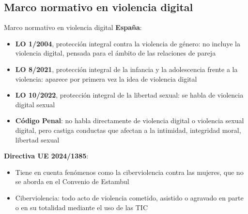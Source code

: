 \documentclass{beamer}
\begin{document}
    \subsection{Marco normativo en violencia digital}
    \begin{frame}{Marco normativo en violencia digital}
        \textbf{España}:
        \begin{itemize}
            \footnotesize
            \item \textbf{LO 1/2004}, protección integral contra la violencia de género: no incluye la violencia digital, pensada para el ámbito de las relaciones de pareja
            \item \textbf{LO 8/2021}, protección integral de la infancia y la adolescencia frente a la violencia: aparece por primera vez la idea de violencia digital
            \item \textbf{LO 10/2022}, protección integral de la libertad sexual: se habla de violencia digital sexual
            \item \textbf{Código Penal}: no habla directamente de violencia digital o violencia sexual digital, pero castiga conductas que afectan a la intimidad, integridad moral, libertad sexual
        \end{itemize}
        \textbf{Directiva UE 2024/1385}:
        \begin{itemize}
            \footnotesize
            \item Tiene en cuenta fenómenos como la ciberviolencia contra las mujeres, que no se aborda en el Convenio de Estambul
            \item Ciberviolencia: todo acto de violencia cometido, asistido o agravado en parte o en su totalidad mediante el uso de las TIC
        \end{itemize}
    \end{frame}
\end{document}
